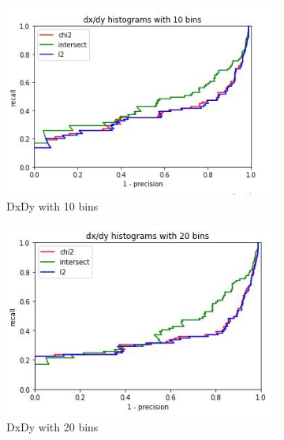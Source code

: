 \documentclass[
	12pt, %
]{fphw}
\begin{document}
\begin{figure}[h!]
     \centering
     \begin{subfigure}[b]{0.3\textwidth}
         \centering
         \includegraphics[width=\textwidth]{img/plots/dxdy_10.JPG}
         \caption{DxDy with 10 bins}
         \label{fig:y equals x}
     \end{subfigure}
     \hfill
     \begin{subfigure}[b]{0.3\textwidth}
         \centering
         \includegraphics[width=\textwidth]{img/plots/dxdy_20.JPG}
         \caption{DxDy with 20 bins}
         \label{fig:three sin x}
     \end{subfigure}
     \hfill
     \begin{subfigure}[b]{0.3\textwidth}
         \centering

\end{subfigure}
\end{figure}
\end{document}

